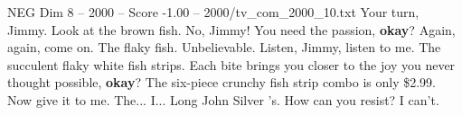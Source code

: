 \begin{textsample}{NEG Dim 8 – 2000 – Score -1.00 – 2000/tv\_com\_2000\_10.txt}  \label{ex:f8_neg_070}
Your turn, Jimmy.
Look at the brown fish.
No, Jimmy!
You need the passion, \textbf{okay}?
Again, again, come on.
The flaky fish.
Unbelievable.
Listen, Jimmy, listen to me.
The succulent flaky white fish strips.
Each bite brings you closer to the joy you never thought possible, \textbf{okay}?
The six-piece crunchy fish strip combo is only \$2.99.
Now give it to me.
The...
I...
Long John Silver 's.
How can you resist?
I can't.

\end{textsample}
